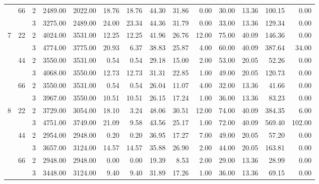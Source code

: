 \begin{tabular}{lllrrrrrrrrrrr}
\cline{2-14}
  & \multirow{2}{*}{66} & 2 &  2489.00 &   2022.00 & 18.76 &   18.76 &   44.30 &   31.86 &    0.00 &   30.00 &   13.36 &  100.15 &     0.00 \\
  &    & 3 &  3275.00 &   2489.00 & 24.00 &   23.34 &   44.36 &   31.79 &    0.00 &   33.00 &   13.36 &  129.34 &     0.00 \\
\cline{1-14}
\cline{2-14}
\multirow{6}{*}{7} & \multirow{2}{*}{22} & 2 &  4024.00 &   3531.00 & 12.25 &   12.25 &   41.96 &   26.76 &   12.00 &   75.00 &   40.09 &  146.36 &     0.00 \\
  &    & 3 &  4774.00 &   3775.00 & 20.93 &    6.37 &   38.83 &   25.87 &    4.00 &   60.00 &   40.09 &  387.64 &    34.00 \\
\cline{2-14}
  & \multirow{2}{*}{44} & 2 &  3550.00 &   3531.00 &  0.54 &    0.54 &   29.18 &   15.00 &    2.00 &   53.00 &   20.05 &   52.26 &     0.00 \\
  &    & 3 &  4068.00 &   3550.00 & 12.73 &   12.73 &   31.31 &   22.85 &    1.00 &   49.00 &   20.05 &  120.73 &     0.00 \\
\cline{2-14}
  & \multirow{2}{*}{66} & 2 &  3550.00 &   3531.00 &  0.54 &    0.54 &   26.04 &   11.07 &    4.00 &   32.00 &   13.36 &   41.66 &     0.00 \\
  &    & 3 &  3967.00 &   3550.00 & 10.51 &   10.51 &   26.15 &   17.24 &    1.00 &   36.00 &   13.36 &   83.23 &     0.00 \\
\cline{1-14}
\cline{2-14}
\multirow{6}{*}{8} & \multirow{2}{*}{22} & 2 &  3729.00 &   3054.00 & 18.10 &    3.24 &   48.06 &   30.51 &   12.00 &   74.00 &   40.09 &  384.35 &     6.00 \\
  &    & 3 &  4751.00 &   3749.00 & 21.09 &    9.58 &   43.56 &   25.17 &    1.00 &   72.00 &   40.09 &  569.40 &   102.00 \\
\cline{2-14}
  & \multirow{2}{*}{44} & 2 &  2954.00 &   2948.00 &  0.20 &    0.20 &   36.95 &   17.27 &    7.00 &   49.00 &   20.05 &   57.20 &     0.00 \\
  &    & 3 &  3657.00 &   3124.00 & 14.57 &   14.57 &   35.88 &   26.90 &    2.00 &   44.00 &   20.05 &  163.81 &     0.00 \\
\cline{2-14}
  & \multirow{2}{*}{66} & 2 &  2948.00 &   2948.00 &  0.00 &    0.00 &   19.39 &    8.53 &    2.00 &   29.00 &   13.36 &   28.99 &     0.00 \\
  &    & 3 &  3448.00 &   3124.00 &  9.40 &    9.40 &   31.89 &   17.26 &    1.00 &   36.00 &   13.36 &   69.15 &     0.00 \\
\cline{1-14}

\end{tabular}
